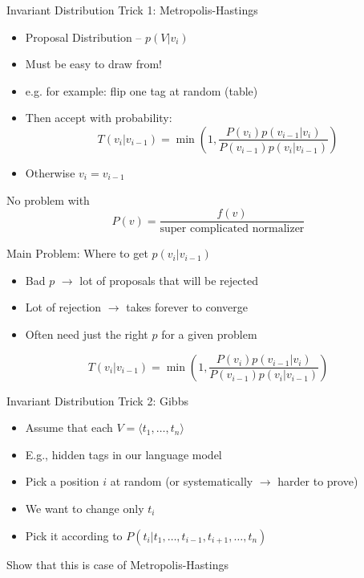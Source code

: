 \documentclass[11pt]{beamer}
\begin{document}
	\begin{frame}{Invariant Distribution Trick 1: Metropolis-Hastings}
		\begin{itemize}
			\item Proposal Distribution -- $p(V|v_i)$
			\item Must be easy to draw from!
			\item e.g. for example: flip one tag at random (table)
			\item Then accept with probability:
				$$T(v_i|v_{i-1}) = \min\left(1,\frac{P(v_i)p(v_{i-1}|v_i)}{P(v_{i-1})p(v_i|v_{i-1})}\right)$$
			\item Otherwise $v_i = v_{i-1}$
		\end{itemize}
		
		\vspace{10pt} No problem with $$P(v) = \frac{f(v)}{\mbox{super complicated normalizer}}$$
	\end{frame}
	
	\begin{frame}{Main Problem: Where to get $p(v_i|v_{i-1})$}
		\begin{itemize}
			\item Bad $p$ $\rightarrow$  lot of proposals that will be rejected
			\item Lot of rejection $\rightarrow$ takes forever to converge
			\item Often need just the right $p$ for a given problem
		\end{itemize}
		
		$$T(v_i|v_{i-1}) = \min\left(1,\frac{P(v_i)p(v_{i-1}|v_i)}{P(v_{i-1})p(v_i|v_{i-1})}\right)$$
	\end{frame}
	
	\begin{frame}{Invariant Distribution Trick 2: Gibbs}
		\begin{itemize}
			\item Assume that each $V = \langle t_1, \dots, t_n \rangle$
			\item E.g., hidden tags in our language model
			\item Pick a position $i$ at random (or systematically $\rightarrow$ harder to prove)
			\item We want to change only $t_i$
			\item Pick it according to $P(t_i|t_1,\dots,t_{i-1},t_{i+1},\dots,t_n)$
		\end{itemize}
		
		\vspace{10pt}Show that this is case of Metropolis-Hastings
	\end{frame}
	
\end{document}
